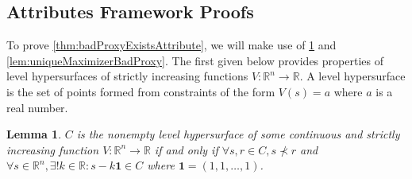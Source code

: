 \documentclass{article}
\newtheorem{Lemma}{Lemma}[section] \crefname{Lemma}{Lemma}{Lemmas}
\begin{document}
\subsection{Attributes Framework Proofs}
To prove \cref{thm:badProxyExistsAttribute}, we will make use of \cref{lem:proxyLevelHyperSurfaceProperties} and \cref{lem:uniqueMaximizerBadProxy}. The first given below provides properties of level hypersurfaces of strictly increasing functions $V : \mathbb R^n \rightarrow \mathbb R$. A level hypersurface is the set of points formed from constraints of the form $V(s) = a$ where $a$ is a real number.

\begin{Lemma} \label{lem:proxyLevelHyperSurfaceProperties}
$C$ is the nonempty level hypersurface of some continuous and strictly increasing function $V : \mathbb R^n \rightarrow \mathbb R$ if and only if $\forall s, r \in C, s \not\prec r$ and $\forall s \in \mathbb R^n, \exists! k \in \mathbb R : s - k \bm 1 \in C$ where $\bm 1 = (1,1,\dots,1)$.
\end{Lemma}
\end{document}
